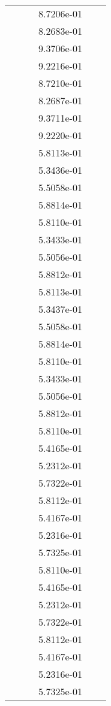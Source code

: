 \begin{xltabular}{\textwidth}{r|rS[table-format=1.3e+2]S[table-format=1.4e+2]S[table-format=1.4e+2]S[table-format=-1.5]}
&  &  & 8.7206e-01 & & \\
&  &  & 8.2683e-01 & & \\
&  &  & 9.3706e-01 & & \\
&  &  & 9.2216e-01 & & \\
&  &  & 8.7210e-01 & & \\
&  &  & 8.2687e-01 & & \\
&  &  & 9.3711e-01 & & \\
&  &  & 9.2220e-01 & & \\
&  &  & 5.8113e-01 & & \\
&  &  & 5.3436e-01 & & \\
&  &  & 5.5058e-01 & & \\
&  &  & 5.8814e-01 & & \\
&  &  & 5.8110e-01 & & \\
&  &  & 5.3433e-01 & & \\
&  &  & 5.5056e-01 & & \\
&  &  & 5.8812e-01 & & \\
&  &  & 5.8113e-01 & & \\
&  &  & 5.3437e-01 & & \\
&  &  & 5.5058e-01 & & \\
&  &  & 5.8814e-01 & & \\
&  &  & 5.8110e-01 & & \\
&  &  & 5.3433e-01 & & \\
&  &  & 5.5056e-01 & & \\
&  &  & 5.8812e-01 & & \\
&  &  & 5.8110e-01 & & \\
&  &  & 5.4165e-01 & & \\
&  &  & 5.2312e-01 & & \\
&  &  & 5.7322e-01 & & \\
&  &  & 5.8112e-01 & & \\
&  &  & 5.4167e-01 & & \\
&  &  & 5.2316e-01 & & \\
&  &  & 5.7325e-01 & & \\
&  &  & 5.8110e-01 & & \\
&  &  & 5.4165e-01 & & \\
&  &  & 5.2312e-01 & & \\
&  &  & 5.7322e-01 & & \\
&  &  & 5.8112e-01 & & \\
&  &  & 5.4167e-01 & & \\
&  &  & 5.2316e-01 & & \\
&  &  & 5.7325e-01 & & \\

\end{xltabular}
